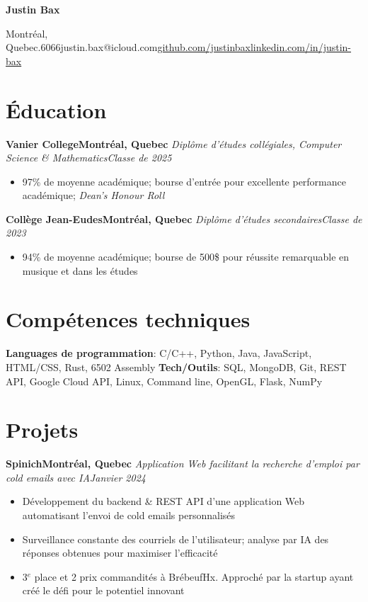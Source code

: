 \documentclass{article}
\newcommand{\cdelim}{\;\textbar\;}
\newcommand{\newrole}[4]{
    {\normalfont\bfseries #1\hfill#3}
    \newline
    \textit{#2}\hfill\textit{#4}
}
\newenvironment{bulletpoints}{\vspace*{-0.2em}\begin{itemize}\setlength\itemsep{-0.3em}}{\end{itemize}}
\begin{document}
\begin{center}
    {\Huge\bfseries Justin Bax}\\\vspace*{2pt}

    Montréal, Quebec\cdelim 438.763.6066\cdelim justin.bax@icloud.com\cdelim\href{https://github.com/justinbax}{github.com/justinbax}\cdelim\href{https://linkedin.com/in/justin-bax}{linkedin.com/in/justin-bax}\\
\end{center}

\section*{Éducation}

\newrole{Vanier College}{Diplôme d'études collégiales, Computer Science \& Mathematics}{Montréal, Quebec}{Classe de 2025}
\begin{bulletpoints}
    \item 97\% de moyenne académique; bourse d'entrée pour excellente performance académique; \textit{Dean's Honour Roll} 
\end{bulletpoints}

\newrole{Collège Jean-Eudes}{Diplôme d'études secondaires}{Montréal, Quebec}{Classe de 2023}
\begin{bulletpoints}
    \item 94\% de moyenne académique; bourse de 500\$ pour réussite remarquable en musique et dans les études 
\end{bulletpoints}


\section*{Compétences techniques}

{\bfseries Languages de programmation}: C/C++, Python, Java, JavaScript, HTML/CSS, Rust, 6502 Assembly
\newline
{\bfseries Tech/Outils}: SQL, MongoDB, Git, REST API, Google Cloud API, Linux, Command line, OpenGL, Flask, NumPy


\section*{Projets}

\newrole{Spinich}{Application Web facilitant la recherche d'emploi par cold emails avec IA}{Montréal, Quebec}{Janvier 2024}
\begin{bulletpoints}
    \item Développement du backend \& REST API d’une application Web automatisant l’envoi de cold emails personnalisés
    \item Surveillance constante des courriels de l’utilisateur; analyse par IA des réponses obtenues pour maximiser l’efficacité
    \item 3$^e$\hspace*{-0.1em} place et 2 prix commandités à BrébeufHx. Approché par la startup ayant créé le défi pour le potentiel innovant
\end{bulletpoints}
\end{document}
